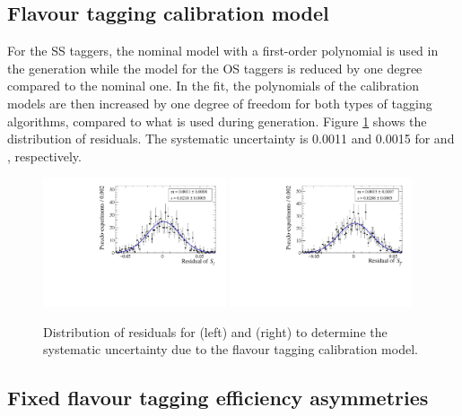 \subsection*{Flavour tagging calibration model}

For the SS taggers, the nominal model with a first-order polynomial is used in the generation while the model for the OS taggers is reduced by one degree compared to the nominal one.
In the fit, the polynomials of the calibration models are then increased by one degree of freedom for both types of tagging algorithms, compared to what is used during generation. Figure \ref{fig:systUncertFTmodel} shows the distribution of residuals. The systematic uncertainty is \num{0.0011} and \num{0.0015} for \Sf and \Sfbar, respectively.
\begin{figure}[tbp]
    \centering
    \includegraphics[width=0.48\textwidth]{10Systematics/figs/FT_Sf_res.pdf}
    \includegraphics[width=0.48\textwidth]{10Systematics/figs/FT_Sfbar_res.pdf}
    \caption{Distribution of residuals for \Sf (left) and \Sfbar (right) to determine the systematic uncertainty due to the flavour tagging calibration model.}
    \label{fig:systUncertFTmodel}
\end{figure}

\subsection*{Fixed flavour tagging efficiency asymmetries}

